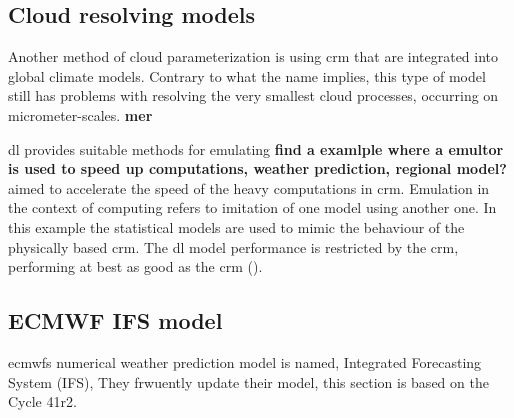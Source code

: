 \subsection{Cloud resolving models} \label{sec:params_climate_models}
Another method of cloud parameterization is using \acrfull{crm} that are integrated into global climate models. Contrary to what the name implies, this type of model still has problems with resolving the very smallest cloud processes, occurring on micrometer-scales. 
\textbf{mer}

\acrshort{dl} provides suitable methods for emulating \textbf{find a examlple where a emultor is used to speed up computations, weather prediction, regional model?} 
aimed to accelerate the speed of the heavy computations in \acrshort{crm}. Emulation in the context of computing refers to imitation of one model using another one. In this example the statistical models are used to mimic the behaviour of the physically based \acrshort{crm}. The \acrshort{dl} model performance is restricted by the  \acrshort{crm}, performing at best as good as the \acrshort{crm} (\cite{Rasp2018DeepModels}).

\subsection{ECMWF IFS model} \label{sec:IFS_param}
\acrfull{ecmwf}s numerical weather prediction model is named, Integrated Forecasting System (IFS), They frwuently update their model, this section is based on the Cycle 41r2. 


